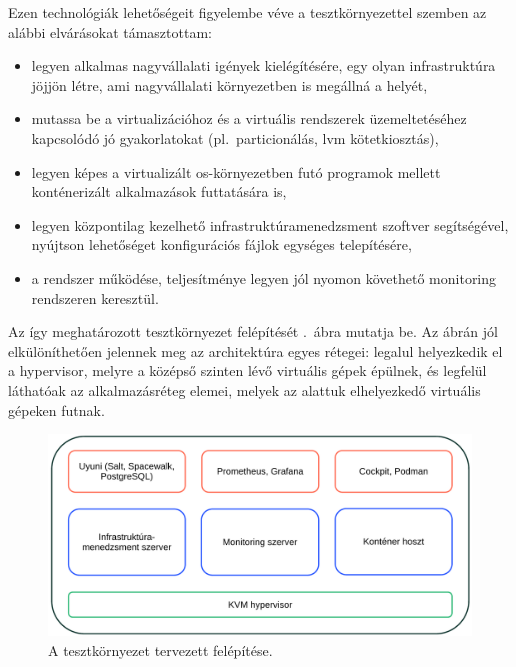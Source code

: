 Ezen technológiák lehetőségeit figyelembe véve a tesztkörnyezettel szemben az alábbi elvárásokat támasztottam:
\begin{itemize}
	\item legyen alkalmas nagyvállalati igények kielégítésére, egy olyan infrastruktúra jöjjön létre, ami nagyvállalati környezetben is megállná a helyét,
	\item mutassa be a virtualizációhoz és a virtuális rendszerek üzemeltetéséhez kapcsolódó jó gyakorlatokat (pl.~particionálás, \acrshort{lvm} kötetkiosztás),
	\item legyen képes a virtualizált \acrshort{os}-környezetben futó programok mellett konténerizált alkalmazások futtatására is,
	\item legyen központilag kezelhető infrastruktúramenedzsment szoftver segítségével, nyújtson lehetőséget konfigurációs fájlok egységes telepítésére,
	\item a rendszer működése, teljesítménye legyen jól nyomon követhető monitoring rendszeren keresztül.
\end{itemize}

Az így meghatározott tesztkörnyezet felépítését .~ábra mutatja be. Az ábrán jól elkülöníthetően jelennek meg az architektúra egyes rétegei: legalul helyezkedik el a \gls{hypervisor}, melyre a középső szinten lévő virtuális gépek épülnek, és legfelül láthatóak az alkalmazásréteg elemei, melyek az alattuk elhelyezkedő virtuális gépeken futnak.

\begin{figure}[!ht]
	\centering
	\includegraphics[width=15cm]{figures/architektura.pdf}
	\caption{A tesztkörnyezet tervezett felépítése.}
	\label{fig:test-env-arch}
\end{figure}

